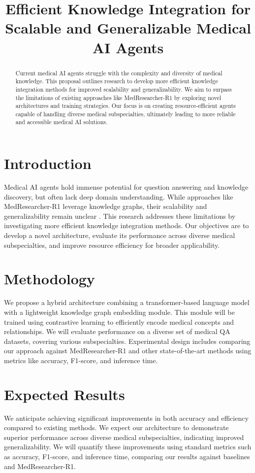 \documentclass{article}
\title{Efficient Knowledge Integration for Scalable and Generalizable Medical AI Agents}
\author{}
\date{}
\begin{document}
\maketitle

\begin{abstract}
Current medical AI agents struggle with the complexity and diversity of medical knowledge. This proposal outlines research to develop more efficient knowledge integration methods for improved scalability and generalizability. We aim to surpass the limitations of existing approaches like MedResearcher-R1 by exploring novel architectures and training strategies. Our focus is on creating resource-efficient agents capable of handling diverse medical subspecialties, ultimately leading to more reliable and accessible medical AI solutions.
\end{abstract}

\section{Introduction}
Medical AI agents hold immense potential for question answering and knowledge discovery, but often lack deep domain understanding. While approaches like MedResearcher-R1 leverage knowledge graphs, their scalability and generalizability remain unclear \cite{medresearcher}. This research addresses these limitations by investigating more efficient knowledge integration methods. Our objectives are to develop a novel architecture, evaluate its performance across diverse medical subspecialties, and improve resource efficiency for broader applicability.

\section{Methodology}
We propose a hybrid architecture combining a transformer-based language model with a lightweight knowledge graph embedding module. This module will be trained using contrastive learning to efficiently encode medical concepts and relationships. We will evaluate performance on a diverse set of medical QA datasets, covering various subspecialties. Experimental design includes comparing our approach against MedResearcher-R1 and other state-of-the-art methods using metrics like accuracy, F1-score, and inference time.

\section{Expected Results}
We anticipate achieving significant improvements in both accuracy and efficiency compared to existing methods. We expect our architecture to demonstrate superior performance across diverse medical subspecialties, indicating improved generalizability. We will quantify these improvements using standard metrics such as accuracy, F1-score, and inference time, comparing our results against baselines and MedResearcher-R1.
\end{document}
